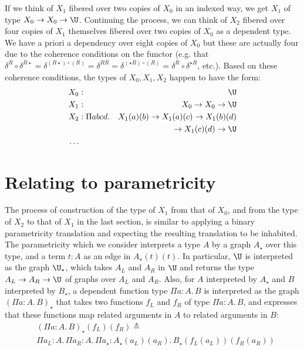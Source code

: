 \documentclass{msc}
\newcommand{\defeq}{\ensuremath{\triangleq}}
\newcommand{\kstar}{{\star}}
\begin{document}
If we think of $X_1$ fibered over two copies of $X_0$ in an indexed way, we get $X_1$ of type $X_0 \rightarrow X_0 \rightarrow \U$. Continuing the process, we can think of $X_2$ fibered over four copies of $X_1$ themselves fibered over two copies of $X_0$ as a dependent type. We have a priori a dependency over eight copies of $X_0$ but these are actually four due to the coherence conditions on the functor (e.g. that $\delta^R \circ \delta^{R\kstar} = \delta^{(R\kstar)\circ(R)} = \delta^{RR} = \delta^{(\kstar R)\circ(R)} = \delta^R \circ \delta^{\kstar R}$, etc.). Based on these coherence conditions, the types of $X_0, X_1, X_2$ happen to have the form:
\begin{align*}
  X_0 & :              & \U                                                     \\
  X_1 & :              & X_0 \rightarrow X_0 \rightarrow \U                     \\
  X_2 & : \Pi a b c d. & X_1(a)(b) \rightarrow X_1(a)(c) \rightarrow X_1 (b)(d) \\
      &                & \rightarrow X_1 (c)(d) \rightarrow \U                  \\
  \ldots
\end{align*}
\section{Relating to parametricity\label{sec:rel-param}}
The process of construction of the type of $X_1$ from that of $X_0$, and from the type of $X_2$ to that of $X_1$ in the last section, is similar to applying a binary parametricity translation and expecting the resulting translation to be inhabited. The parametricity which we consider interprets a type $A$ by a graph $A_\kstar$ over this type, and a term $t: A$ as an edge in $A_\kstar(t)(t)$. In particular, $\U$ is interpreted as the graph ${\U}_\kstar$, which takes $A_L$ and $A_R$ in $\U$ and returns the type $A_L \rightarrow A_R \rightarrow \U$ of graphs over $A_L$ and $A_R$. Also, for $A$ interpreted by $A_\kstar$ and $B$ interpreted by $B_\kstar$, a dependent function type $\Pi a: A.\, B$ is interpreted as the graph $(\Pi a: A.\, B)_\kstar$ that takes two functions $f_L$ and $f_R$ of type $\Pi a: A.\, B$, and expresses that these functions map related arguments in $A$ to related arguments in $B$:
\begin{align*}
   & (\Pi a: A.\, B)_\kstar(f_L)(f_R) \defeq                                                      \\
   & \Pi a_L: A.\, \Pi a_R: A.\, \Pi a_\kstar: A_\kstar(a_L)(a_R).\, B_\kstar(f_L(a_L))(f_R(a_R))
\end{align*}
\end{document}
